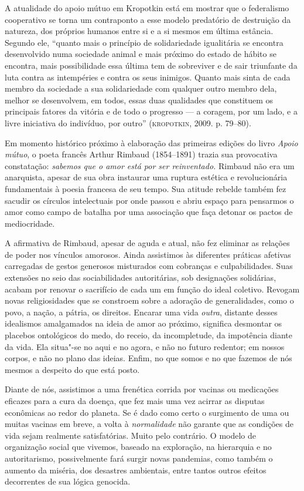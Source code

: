 A atualidade do apoio mútuo em Kropotkin está em mostrar que o
federalismo cooperativo se torna um contraponto a esse modelo predatório
de destruição da natureza, dos próprios humanos entre si e a si mesmos
em última estância. Segundo ele, ``quanto mais o princípio de
solidariedade igualitária se encontra desenvolvido numa sociedade animal
e mais próximo do estado de hábito se encontra, mais possibilidade essa
última tem de sobreviver e de sair triunfante da luta contra as
intempéries e contra os seus inimigos. Quanto mais sinta de cada membro
da sociedade a sua solidariedade com qualquer outro membro dela, melhor
se desenvolvem, em todos, essas duas qualidades que constituem os
principais fatores da vitória e de todo o progresso --- a coragem, por
um lado, e a livre iniciativa do indivíduo, por outro'' (\textsc{kropotkin},
2009. p. 79--80).

Em momento histórico próximo à elaboração das primeiras edições do livro
\emph{Apoio mútuo}, o poeta francês Arthur Rimbaud (1854--1891) trazia
sua provocativa constatação: \emph{sabemos que o amor está por ser
reinventado.} Rimbaud não era um anarquista, apesar de sua obra
instaurar uma ruptura estética e revolucionária fundamentais à poesia
francesa de seu tempo. Sua atitude rebelde também fez sacudir os
círculos intelectuais por onde passou e abriu espaço para pensarmos o
amor como campo de batalha por uma associação que faça detonar os pactos
de mediocridade.

A afirmativa de Rimbaud, apesar de aguda e atual, não fez eliminar as
relações de poder nos vínculos amorosos. Ainda assistimos às diferentes
práticas afetivas carregadas de gestos generosos misturados com
cobranças e culpabilidades. Suas extensões no seio das sociabilidades
autoritárias, sob designações solidárias, acabam por renovar o
sacrifício de cada um em função do ideal coletivo. Revogam novas
religiosidades que se constroem sobre a adoração de generalidades, como
o povo, a nação, a pátria, os direitos. Encarar uma vida \emph{outra},
distante desses idealismos amalgamados na ideia de amor ao próximo,
significa desmontar os placebos ontológicos do medo, do receio, da
incompletude, da impotência diante da vida. Ela situa"-se no aqui e no
agora, e não no futuro redentor; em nossos corpos, e não no plano das
ideias. Enfim, no que somos e no que fazemos de nós mesmos a despeito do
que está posto.

Diante de nós, assistimos a uma frenética corrida por vacinas ou
medicações eficazes para a cura da doença, que fez mais uma vez acirrar
as disputas econômicas ao redor do planeta. Se é dado como certo o
surgimento de uma ou muitas vacinas em breve, a volta à
\emph{normalidade} não garante que as condições de vida sejam realmente
satisfatórias. Muito pelo contrário. O modelo de organização social que
vivemos, baseado na exploração, na hierarquia e no autoritarismo,
possivelmente fará surgir novas pandemias, como também o aumento da
miséria, dos desastres ambientais, entre tantos outros efeitos
decorrentes de sua lógica genocida.

